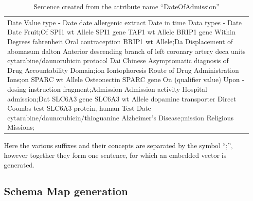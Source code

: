 \documentclass{ieeeaccess}
\begin{document}
\begin{table}[]
	\centering
	\caption{Sentence created from the attribute name ``DateOfAdmission''}
	\label{tab:sentence_example}
	\begin{tabular}{p{\linewidth}}
		Date Value type - Date date allergenic extract Date in time Data types - Date Date Fruit;Of SPI1 wt Allele SPI1 gene TAF1 wt Allele BRIP1 gene Within Degrees fahrenheit Oral contraception BRIP1 wt Allele;Da Displacement of abomasum dalton Anterior descending branch of left coronary artery deca units cytarabine/daunorubicin protocol Dai Chinese Asymptomatic diagnosis of Drug Accountability Domain;ion Iontophoresis Route of Drug Administration Ions;on SPARC wt Allele Osteonectin SPARC gene On (qualifier value) Upon - dosing instruction fragment;Admission Admission activity Hospital admission;Dat SLC6A3 gene SLC6A3 wt Allele dopamine transporter Direct Coombs test SLC6A3 protein, human Test Date cytarabine/daunorubicin/thioguanine Alzheimer's Disease;mission Religious Missions;
	\end{tabular}
\end{table}

Here the various suffixes and their concepts are separated by the symbol ``;'', however together they form one sentence, for which an embedded vector is generated. 

\subsection{Schema Map generation}
\label{schema_map_gen}
\end{document}
